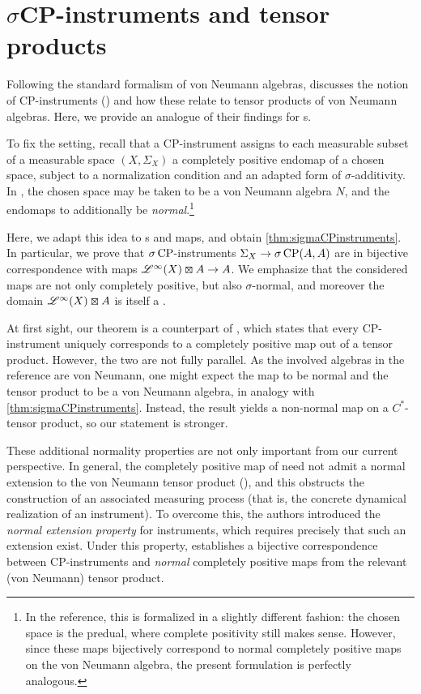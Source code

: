 \section{\texorpdfstring{$\sigma$CP}{σCP}-instruments and tensor products}\label{sec:sigmaCP}
Following the standard formalism of von Neumann algebras, \cite{okamura2015measurement} discusses the notion of CP-instruments (\cite{davies1970operational,ozawa1984quantummeasuring}) and how these relate to tensor products of von Neumann algebras.
Here, we provide an analogue of their findings for \cstars{}s.

To fix the setting, recall that a CP-instrument assigns to each measurable subset of a measurable space $(X,\Sigma_X)$ a completely positive endomap of a chosen space, subject to a normalization condition and an adapted form of $\sigma$-additivity. 
In \cite{okamura2015measurement}, the chosen space may be taken to be a
von Neumann algebra $N$, and the endomaps to additionally be \emph{normal}.\footnote{In the reference, this is formalized in a slightly different fashion: the chosen space is the predual, where complete positivity still makes sense. However, since these maps bijectively correspond to normal completely positive maps on the von Neumann algebra, the present formulation is perfectly analogous.}

Here, we adapt this idea to \cstars{}s and \scpu{} maps, and obtain \cref{thm:sigmaCPinstruments}. 
In particular, we prove that $\sigma\operatorname{CP}$-instruments $\Sigma_X \to \sigma\operatorname{CP}({A},{A})$ are in bijective correspondence with \scpu{} maps $\Linf(X)\kocktensor \A\to \A$. 
We emphasize that the considered maps are not only completely positive, but also $\sigma$-normal, and moreover the domain $\Linf(X)\kocktensor \A$ is itself a \cstars{}.

At first sight, our theorem is a \cstars{} counterpart of \cite[Proposition 3.3]{okamura2015measurement}, which states that every CP-instrument uniquely corresponds to a completely positive map out of a tensor product. 
However, the two are not fully parallel.
As the involved algebras in the reference are von Neumann, one might expect the map to be normal and the tensor product to be a von Neumann algebra, in analogy with \cref{thm:sigmaCPinstruments}.
Instead, the result yields a non-normal map on a
$C^*$-tensor product, so our statement is stronger.

These additional normality properties are not only important from our current perspective. 
In general, the completely positive map of \cite[Proposition 3.3]{okamura2015measurement} need not admit a normal extension to the von Neumann tensor product (\cite[\S V]{okamura2015measurement}), and this obstructs the construction of an associated measuring process (that is, the concrete dynamical realization of an instrument).
To overcome this, the authors introduced the \emph{normal extension property} for instruments, which requires precisely that such an extension exist.
Under this property, \cite[Theorem 3.4]{okamura2015measurement}
establishes a bijective correspondence between CP-instruments and
\emph{normal} completely positive maps from the relevant (von Neumann)
tensor product.

